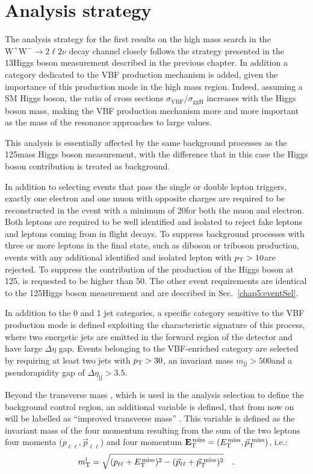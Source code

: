 \section{Analysis strategy}\label{chap6:AnalysisStrategy}

The analysis strategy for the first results on the high mass search in the $\mathrm{W^+W^-}\to2\ell2\nu$ decay channel closely follows the strategy presented in the 13\TeV Higgs boson measurement described in the previous chapter. In addition a category dedicated to the VBF production mechanism is added, given the importance of this production mode in the high mass region. Indeed, assuming a SM Higgs boson, the ratio of cross sections $\sigma_\mathrm{VBF}/\sigma_\mathrm{ggH}$ increases with the Higgs boson mass, making the VBF production mechanism more and more important as the mass of the resonance approaches to large values.

This analysis is essentially affected by the same background processes as the 125\GeV mass Higgs boson measurement, with the difference that in this case the Higgs boson contribution is treated as background.

In addition to selecting events that pass the single or double lepton triggers, exactly one electron and one muon with opposite charges are required to be reconstructed in the event with a minimum \pt of 20\GeV for both the muon and electron. Both leptons are
required to be well identified and isolated to reject fake leptons and leptons
coming from in flight decays. To suppress background processes with three or more leptons in the final state, such as diboson or triboson production, events with any additional identified and isolated 
lepton with $p_\mathrm{T}>10$\GeV are rejected. To suppress the contribution of the production of the Higgs boson at 125\GeV, \mll is requested to be higher than 50\GeV. The other event requirements are identical to the 125\GeV Higgs boson measurement and are described in Sec.~\ref{chap5:eventSel}.

In addition to the 0 and 1 jet categories, a specific category sensitive to the VBF production mode is defined exploiting the characteristic signature of this process, where two energetic jets are emitted in the forward region of the detector and have large $\Delta\eta$ gap. Events belonging to the VBF-enriched category are selected by requiring at least two jets with $p_\mathrm{T}>30$\GeV, an invariant mass $m_\mathrm{jj}>500$\GeV and a pseudorapidity gap of $\Delta\eta_\mathrm{jj}>3.5$.

Beyond the transverse mass \mt, which is used in the analysis selection to define the \dytt background control region, an additional variable is defined, that from now on will be labelled as ``improved transverse mass'' \mti. This variable is defined as the invariant mass of the four momentum resulting from the sum of the two leptons four momenta ($p_{\ell\ell},\vec{p}_{\ell\ell}$) and four momentum $\mathbf{E_\mathrm{T}^\mathrm{\,miss}} = (E_\mathrm{T}^\mathrm{\,miss}, \vec{p}_\mathrm{T}^\mathrm{~miss})$, i.e.:
\begin{equation} 
m_\mathrm{T}^\mathrm{i} = \sqrt{(p_{\ell\ell}+E_\mathrm{T}^\mathrm{\,miss})^2-(\vec{p}_{\ell\ell}+\vec{p}_\mathrm{T}^\mathrm{~miss})^2} \quad .
\end{equation}

